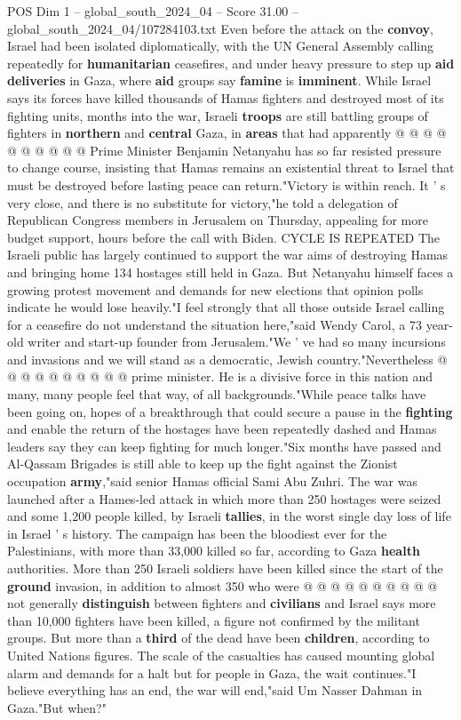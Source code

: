 \begin{textsample}{POS Dim 1 – global\_south\_2024\_04 – Score 31.00 – global\_south\_2024\_04/107284103.txt}
Even before the attack on the \textbf{convoy}, Israel had been isolated diplomatically, with the UN General Assembly calling repeatedly for \textbf{humanitarian} ceasefires, and under heavy pressure to step up \textbf{aid} \textbf{deliveries} in Gaza, where \textbf{aid} groups say \textbf{famine} is \textbf{imminent}.
While Israel says its forces have killed thousands of Hamas fighters and destroyed most of its fighting units, months into the war, Israeli \textbf{troops} are still battling groups of fighters in \textbf{northern} and \textbf{central} Gaza, in \textbf{areas} that had apparently @ @ @ @ @ @ @ @ @ @ Prime Minister Benjamin Netanyahu has so far resisted pressure to change course, insisting that Hamas remains an existential threat to Israel that must be destroyed before lasting peace can return."Victory is within reach.
It ' s very close, and there is no substitute for victory,"he told a delegation of Republican Congress members in Jerusalem on Thursday, appealing for more budget support, hours before the call with Biden.
CYCLE IS REPEATED The Israeli public has largely continued to support the war aims of destroying Hamas and bringing home 134 hostages still held in Gaza.
But Netanyahu himself faces a growing protest movement and demands for new elections that opinion polls indicate he would lose heavily."I feel strongly that all those outside Israel calling for a ceasefire do not understand the situation here,"said Wendy Carol, a 73 year-old writer and start-up founder from Jerusalem."We ' ve had so many incursions and invasions and we will stand as a democratic, Jewish country."Nevertheless @ @ @ @ @ @ @ @ @ @ prime minister.
He is a divisive force in this nation and many, many people feel that way, of all backgrounds."While peace talks have been going on, hopes of a breakthrough that could secure a pause in the \textbf{fighting} and enable the return of the hostages have been repeatedly dashed and Hamas leaders say they can keep fighting for much longer."Six months have passed and Al-Qassam Brigades is still able to keep up the fight against the Zionist occupation \textbf{army},"said senior Hamas official Sami Abu Zuhri.
The war was launched after a Hames-led attack in which more than 250 hostages were seized and some 1,200 people killed, by Israeli \textbf{tallies}, in the worst single day loss of life in Israel ' s history.
The campaign has been the bloodiest ever for the Palestinians, with more than 33,000 killed so far, according to Gaza \textbf{health} authorities.
More than 250 Israeli soldiers have been killed since the start of the \textbf{ground} invasion, in addition to almost 350 who were @ @ @ @ @ @ @ @ @ @ not generally \textbf{distinguish} between fighters and \textbf{civilians} and Israel says more than 10,000 fighters have been killed, a figure not confirmed by the militant groups.
But more than a \textbf{third} of the dead have been \textbf{children}, according to United Nations figures.
The scale of the casualties has caused mounting global alarm and demands for a halt but for people in Gaza, the wait continues."I believe everything has an end, the war will end,"said Um Nasser Dahman in Gaza."But when?"


\end{textsample}

